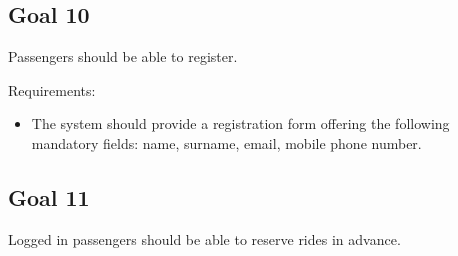 \subsection{Goal 10}
Passengers should be able to register.

Requirements:
\begin{itemize}
\item The system should provide a registration form offering the following mandatory fields: name, surname, email, mobile phone number.
\end{itemize}


\subsection{Goal 11}
Logged in passengers should be able to reserve rides in advance.


